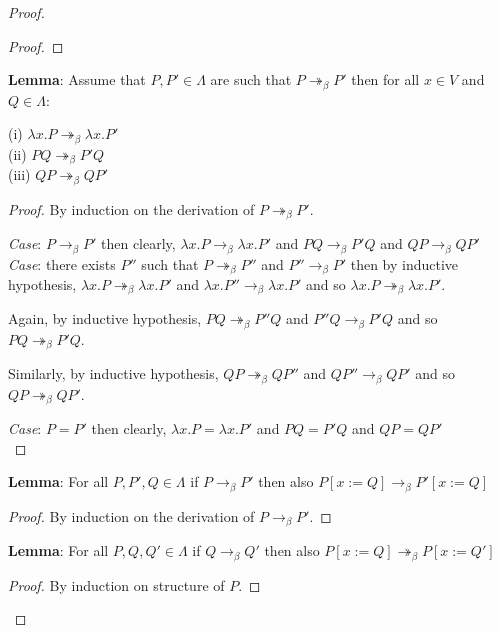 \documentclass[12pt]{article}
\begin{document}
\begin{proof}
\begin{proof}
\end{proof}

\textbf{Lemma}: Assume that $P, P' \in \Lambda$ are such that $P \twoheadrightarrow_{\beta} P'$ then for all $x \in V$ and $Q \in \Lambda$:

(i) $\lambda x.P \twoheadrightarrow_{\beta} \lambda x.P'$ \\
(ii) $P Q \twoheadrightarrow_{\beta} P' Q$ \\
(iii) $Q P \twoheadrightarrow_{\beta} Q P'$ \\

\begin{proof}
By induction on the derivation of $P \twoheadrightarrow_{\beta} P'$.

\textsl{Case}: $P \rightarrow_{\beta} P'$ then clearly, $\lambda x.P \rightarrow_{\beta} \lambda x.P'$  and $P Q \rightarrow_{\beta} P' Q$ and $Q P \rightarrow_{\beta} Q P'$ \\

\textsl{Case}: there exists $P''$ such that $P \twoheadrightarrow_{\beta} P''$ and $P'' \rightarrow_{\beta} P'$ then by inductive hypothesis, $\lambda x.P \twoheadrightarrow_{\beta} \lambda x.P'$ and $\lambda x.P'' \rightarrow_{\beta} \lambda x.P'$  and so $\lambda x.P \twoheadrightarrow_{\beta} \lambda x.P'$. 

Again, by inductive hypothesis, $P Q \twoheadrightarrow_{\beta} P'' Q$ and $P'' Q \rightarrow_{\beta} P' Q$ and so $P Q \twoheadrightarrow_{\beta} P' Q$.

Similarly, by inductive hypothesis, $Q P \twoheadrightarrow_{\beta} Q P''$ and $Q P'' \rightarrow_{\beta} Q P'$ and so $Q P \twoheadrightarrow_{\beta} Q P'$.

\textsl{Case}: $P = P'$ then clearly, $\lambda x.P = \lambda x.P'$  and $P Q = P' Q$ and $Q P = Q P'$ \\
\end{proof}

\textbf{Lemma}: For all $P, P', Q \in \Lambda$ if $P \rightarrow_{\beta} P'$ then also $P[x:=Q] \rightarrow_{\beta} P'[x:=Q]$
\begin{proof}
By induction on the derivation of $P \rightarrow_{\beta} P'$.
\end{proof}

\textbf{Lemma}: For all $P,Q,Q' \in \Lambda$ if $Q \rightarrow_{\beta} Q'$ then also $P[x:=Q] \twoheadrightarrow_{\beta} P[x:=Q']$
\begin{proof}
By induction on structure of $P$.


\end{proof}
\end{proof}
\end{document}

